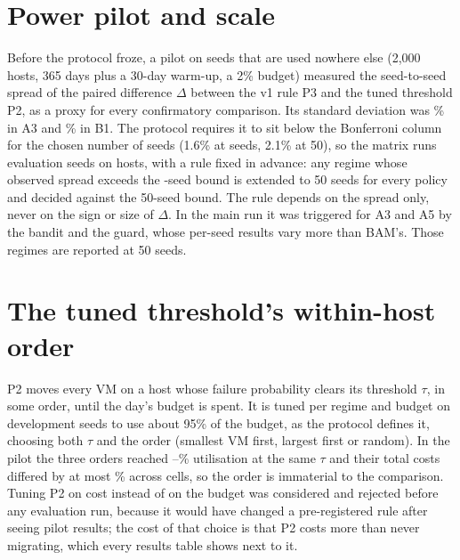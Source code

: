 \section{Power pilot and scale}
\label{app:pilot}
Before the protocol froze, a pilot on seeds that are used nowhere else (2,000 hosts, 365 days
plus a 30-day warm-up, a 2\% budget) measured the seed-to-seed spread of the paired difference
$\Delta$ between the v1 rule P3 and the tuned threshold P2, as a proxy for every confirmatory
comparison. Its standard deviation was \VPilotSDAThree\% in A3 and \VPilotSDBOne\% in B1. The
protocol requires it to sit below the Bonferroni column for the chosen number of seeds (1.6\% at
\VEvalSeeds{} seeds, 2.1\% at 50), so the matrix runs \VEvalSeeds{} evaluation seeds on
\VHosts{} hosts, with a rule fixed in advance: any regime whose observed spread exceeds the
\VEvalSeeds-seed bound is extended to 50 seeds for every policy and decided against the 50-seed
bound. The rule depends on the spread only, never on the sign or size of $\Delta$. In the main
run it was triggered for A3 and A5 by the bandit and the guard, whose per-seed results vary
more than BAM's. Those regimes are reported at 50 seeds.

\section{The tuned threshold's within-host order}
\label{app:p2order}
P2 moves every VM on a host whose failure probability clears its threshold $\tau$, in some order,
until the day's budget is spent. It is tuned per regime and budget on development seeds to use
about 95\% of the budget, as the protocol defines it, choosing both $\tau$ and the order (smallest
VM first, largest first or random). In the pilot the three orders reached \VPTwoUtilLo--\VPTwoUtilHi\%
utilisation at the same $\tau$ and their total costs differed by at most \VPTwoOrderSpread\%
across \VPTwoOrderCells{} cells, so the order is immaterial to the comparison. Tuning P2 on cost
instead of on the budget was considered and rejected before any evaluation run, because it would
have changed a pre-registered rule after seeing pilot results; the cost of that choice is that
P2 costs more than never migrating, which every results table shows next to it.

